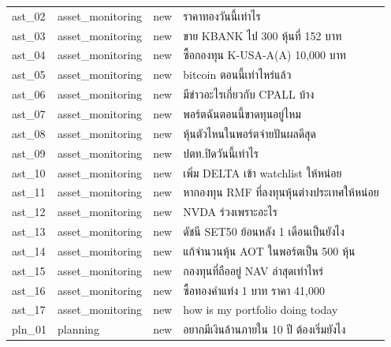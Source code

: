 \documentclass[11pt,a4paper]{article}
\begin{document}
{\begin{longtable}{lllp{9.5cm}}
ast\_\allowbreak{}02 & asset\_\allowbreak{}monitoring & new & {\thaifont ราคาทองวันนี้เท่าไร} \\
ast\_\allowbreak{}03 & asset\_\allowbreak{}monitoring & new & {\thaifont ขาย }KBANK {\thaifont ไป }300 {\thaifont หุ้นที่ }152 {\thaifont บาท} \\
ast\_\allowbreak{}04 & asset\_\allowbreak{}monitoring & new & {\thaifont ซื้อกองทุน }K-USA-A(A) 10,000 {\thaifont บาท} \\
ast\_\allowbreak{}05 & asset\_\allowbreak{}monitoring & new & bitcoin {\thaifont ตอนนี้เท่าไหร่แล้ว} \\
ast\_\allowbreak{}06 & asset\_\allowbreak{}monitoring & new & {\thaifont มีข่าวอะไรเกี่ยวกับ }CPALL {\thaifont บ้าง} \\
ast\_\allowbreak{}07 & asset\_\allowbreak{}monitoring & new & {\thaifont พอร์ตฉันตอนนี้ขาดทุนอยู่ไหม} \\
ast\_\allowbreak{}08 & asset\_\allowbreak{}monitoring & new & {\thaifont หุ้นตัวไหนในพอร์ตจ่ายปันผลดีสุด} \\
ast\_\allowbreak{}09 & asset\_\allowbreak{}monitoring & new & {\thaifont ปตท}.{\thaifont ปิดวันนี้เท่าไร} \\
ast\_\allowbreak{}10 & asset\_\allowbreak{}monitoring & new & {\thaifont เพิ่ม }DELTA {\thaifont เข้า }watchlist {\thaifont ให้หน่อย} \\
ast\_\allowbreak{}11 & asset\_\allowbreak{}monitoring & new & {\thaifont หากองทุน }RMF {\thaifont ที่ลงทุนหุ้นต่างประเทศให้หน่อย} \\
ast\_\allowbreak{}12 & asset\_\allowbreak{}monitoring & new & NVDA {\thaifont ร่วงเพราะอะไร} \\
ast\_\allowbreak{}13 & asset\_\allowbreak{}monitoring & new & {\thaifont ดัชนี }SET50 {\thaifont ย้อนหลัง }1 {\thaifont เดือนเป็นยังไง} \\
ast\_\allowbreak{}14 & asset\_\allowbreak{}monitoring & new & {\thaifont แก้จำนวนหุ้น }AOT {\thaifont ในพอร์ตเป็น }500 {\thaifont หุ้น} \\
ast\_\allowbreak{}15 & asset\_\allowbreak{}monitoring & new & {\thaifont กองทุนที่ถืออยู่ }NAV {\thaifont ล่าสุดเท่าไหร่} \\
ast\_\allowbreak{}16 & asset\_\allowbreak{}monitoring & new & {\thaifont ซื้อทองคำแท่ง }1 {\thaifont บาท ราคา }41,000 \\
ast\_\allowbreak{}17 & asset\_\allowbreak{}monitoring & new & how is my portfolio doing today \\
pln\_\allowbreak{}01 & planning & new & {\thaifont อยากมีเงินล้านภายใน }10 {\thaifont ปี ต้องเริ่มยังไง} \\

\end{longtable}}
\end{document}
